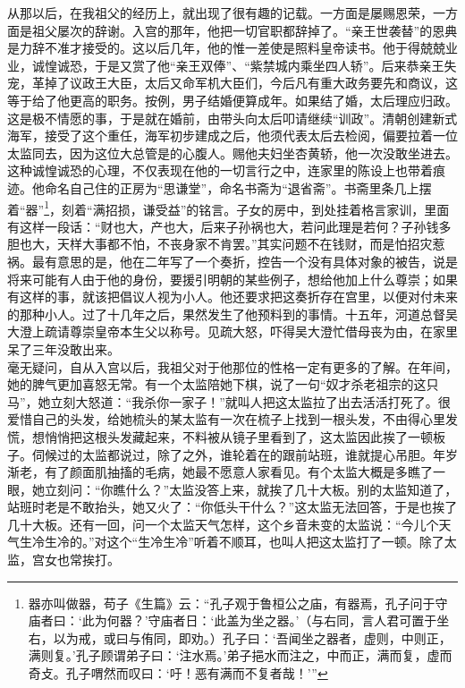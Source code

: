   从那以后，在我祖父的经历上，就出现了很有趣的记载。一方面是屡赐恩荣，一方面是祖父屡次的辞谢。入宫的那年，他把一切官职都辞掉了。“亲王世袭替”的恩典是力辞不准才接受的。这以后几年，他的惟一差使是照料皇帝读书。他于得兢兢业业，诚惶诚恐，于是又赏了他“亲王双俸”、“紫禁城内乘坐四人轿”。后来恭亲王失宠，革掉了议政王大臣，太后又命军机大臣们，今后凡有重大政务要先和商议，这等于给了他更高的职务。按例，男子结婚便算成年。如果结了婚，太后理应归政。这是极不情愿的事，于是就在婚前，由带头向太后叩请继续“训政”。清朝创建新式海军，接受了这个重任，海军初步建成之后，他须代表太后去检阅，偏要拉着一位太监同去，因为这位大总管是的心腹人。赐他夫妇坐杏黄轿，他一次没敢坐进去。这种诚惶诚恐的心理，不仅表现在他的一切言行之中，连家里的陈设上也带着痕迹。他命名自己住的正房为“思谦堂”，命名书斋为“退省斋”。书斋里条几上摆着“器”\footnote{器亦叫做器，苟子《生篇》云：“孔子观于鲁桓公之庙，有器焉，孔子问于守庙者曰：‘此为何器？’守庙者日：‘此盖为坐之器。’（与右同，言人君可置于坐右，以为戒，或曰与侑同，即劝。）孔子曰：‘吾闻坐之器者，虚则，中则正，满则复。’孔子顾谓弟子曰：‘注水焉。’弟子挹水而注之，中而正，满而复，虚而奇攴。孔子喟然而叹曰：‘吁！恶有满而不复者哉！’”}，刻着“满招损，谦受益”的铭言。子女的房中，到处挂着格言家训，里面有这样一段话：“财也大，产也大，后来子孙祸也大，若问此理是若何？子孙钱多胆也大，天样大事都不怕，不丧身家不肯罢。”其实问题不在钱财，而是怕招灾惹祸。最有意思的是，他在二年写了一个奏折，控告一个没有具体对象的被告，说是将来可能有人由于他的身份，要援引明朝的某些例子，想给他加上什么尊崇；如果有这样的事，就该把倡议人视为小人。他还要求把这奏折存在宫里，以便对付未来的那种小人。过了十几年之后，果然发生了他预料到的事情。十五年，河道总督吴大澄上疏请尊崇皇帝本生父以称号。见疏大怒，吓得吴大澄忙借母丧为由，在家里呆了三年没敢出来。\\

  毫无疑问，自从入宫以后，我祖父对于他那位的性格一定有更多的了解。在年间，她的脾气更加喜怒无常。有一个太监陪她下棋，说了一句“奴才杀老祖宗的这只马”，她立刻大怒道：“我杀你一家子！”就叫人把这太监拉了出去活活打死了。很爱惜自己的头发，给她梳头的某太监有一次在梳子上找到一根头发，不由得心里发慌，想悄悄把这根头发藏起来，不料被从镜子里看到了，这太监因此挨了一顿板子。伺候过的太监都说过，除了之外，谁轮着在的跟前站班，谁就提心吊胆。年岁渐老，有了颜面肌抽搐的毛病，她最不愿意人家看见。有个太监大概是多瞧了一眼，她立刻问：“你瞧什么？”太监没答上来，就挨了几十大板。别的太监知道了，站班时老是不敢抬头，她又火了：“你低头干什么？”这太监无法回答，于是也挨了几十大板。还有一回，问一个太监天气怎样，这个乡音未变的太监说：“今儿个天气生冷生冷的。”对这个“生冷生冷”听着不顺耳，也叫人把这太监打了一顿。除了太监，宫女也常挨打。\\

